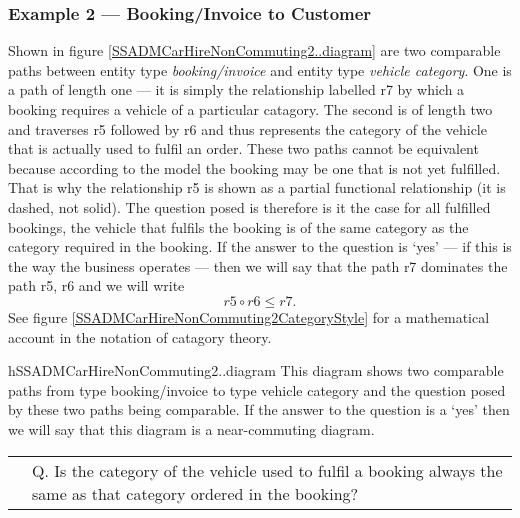 \subsubsection{Example 2 --- Booking/Invoice to Customer}
\mynote
Shown in figure \ref{SSADMCarHireNonCommuting2..diagram} are two comparable paths between entity type \textit{booking/invoice} and
entity type \textit{vehicle category}. One is a path of length one --- it is simply the relationship labelled r7 by which a booking requires a vehicle of a particular catagory.
The second is of length two and traverses r5 followed by r6 and thus represents the category of the vehicle that is actually used to fulfil an order. These two paths cannot be equivalent because according to the model the booking may be one that is not yet fulfilled. That is why the relationship r5 is shown as a partial functional relationship (it is dashed, not solid). The question posed is therefore is it the case for all fulfilled bookings, the vehicle that fulfils the booking is of the same category as the category required in the booking. If the answer to the question is `yes' --- if this is the way the business operates --- then we will say that the path r7 dominates the path r5, r6 and we will write 
\begin{equation*}
r5 \circ r6 \leq r7.
\end{equation*} 
See figure \ref{SSADMCarHireNonCommuting2CategoryStyle} for a mathematical account in the notation of catagory theory.

\begin{erboxedFigure}{h}{SSADMCarHireNonCommuting2..diagram}
{
This diagram  shows two comparable paths from type booking/invoice to type vehicle category and the question posed by these two paths being comparable. 
If the answer to the question is a `yes' then we will say that this diagram is a near-commuting diagram.}
\begin{tabular}{c  p{4.0cm}}
\raisebox{-1.8cm}{\scalebox{0.9}
{}}
&
Q. Is the category of the vehicle used to fulfil a booking always
the same as that category ordered in the booking?\\[0.2cm]
\end{tabular} 
\end{erboxedFigure}


